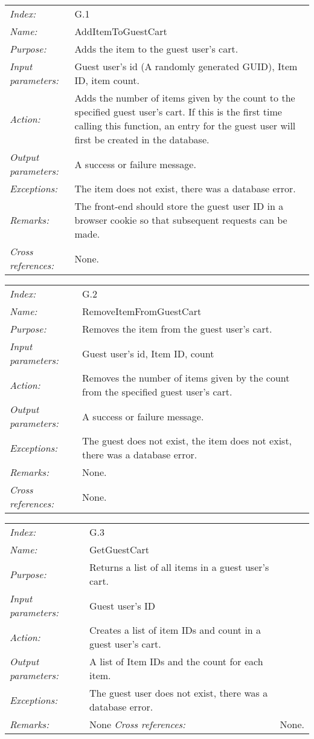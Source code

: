 \documentclass[10pt,letter]{article}
\begin{document}
\begin{tabularx}{\textwidth}{l X}
    \it{Index:} & G.1 \\
    \it{Name:} & AddItemToGuestCart \\
    \it{Purpose:} & Adds the item to the guest user's cart. \\
    \it{Input parameters:} & Guest user's id (A randomly generated GUID), Item ID, item count. \\
    \it{Action:} & Adds the number of items given by the count to the specified guest user's cart. If this is the first time calling this function, 
    an entry for the guest user will first be created in the database.\\
    \it{Output parameters:} & A success or failure message. \\
    \it{Exceptions:} & The item does not exist, there was a database error. \\
    \it{Remarks:} & The front-end should store the guest user ID in a browser cookie so that subsequent requests can be made. \\
    \it{Cross references:} & None. \\
    \hline
\end{tabularx}

\begin{tabularx}{\textwidth}{l X}
    \it{Index:} & G.2 \\
    \it{Name:} & RemoveItemFromGuestCart \\
    \it{Purpose:} & Removes the item from the guest user's cart. \\
    \it{Input parameters:} & Guest user's id, Item ID, count \\
    \it{Action:} & Removes the number of items given by the count from the specified guest user's cart. \\
    \it{Output parameters:} & A success or failure message. \\
    \it{Exceptions:} & The guest does not exist, the item does not exist, there was a database error. \\
    \it{Remarks:} & None. \\
    \it{Cross references:} & None. \\
    \hline
\end{tabularx}

\begin{tabularx}{\textwidth}{l X}
    \it{Index:} & G.3 \\
    \it{Name:} & GetGuestCart \\
    \it{Purpose:} & Returns a list of all items in a guest user's cart. \\
    \it{Input parameters:} & Guest user's ID \\
    \it{Action:} & Creates a list of item IDs and count in a guest user's cart. \\
    \it{Output parameters:} & A list of Item IDs and the count for each item. \\
    \it{Exceptions:} & The guest user does not exist, there was a database error. \\
    \it{Remarks:} & None 
    \it{Cross references:} & None. \\
    \hline
\end{tabularx}
\end{document}
